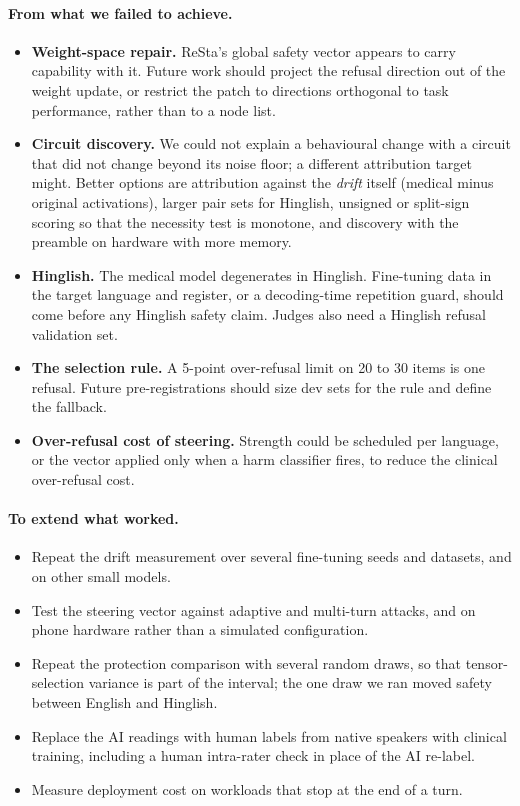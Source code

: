 \paragraph{From what we failed to achieve.}
\begin{itemize}
\item \textbf{Weight-space repair.} ReSta's global safety vector appears to carry capability with it. Future work should project the refusal direction out of the weight update, or restrict the patch to directions orthogonal to task performance, rather than to a node list.
\item \textbf{Circuit discovery.} We could not explain a behavioural change with a circuit that did not change beyond its noise floor; a different attribution target might. Better options are attribution against the \emph{drift} itself (medical minus original activations), larger pair sets for Hinglish, unsigned or split-sign scoring so that the necessity test is monotone, and discovery with the preamble on hardware with more memory.
\item \textbf{Hinglish.} The medical model degenerates in Hinglish. Fine-tuning data in the target language and register, or a decoding-time repetition guard, should come before any Hinglish safety claim. Judges also need a Hinglish refusal validation set.
\item \textbf{The selection rule.} A 5-point over-refusal limit on 20 to 30 items is one refusal. Future pre-registrations should size dev sets for the rule and define the fallback.
\item \textbf{Over-refusal cost of steering.} Strength could be scheduled per language, or the vector applied only when a harm classifier fires, to reduce the clinical over-refusal cost.
\end{itemize}
\paragraph{To extend what worked.}
\begin{itemize}
\item Repeat the drift measurement over several fine-tuning seeds and datasets, and on other small models.
\item Test the steering vector against adaptive and multi-turn attacks, and on phone hardware rather than a simulated configuration.
\item Repeat the protection comparison with several random draws, so that tensor-selection variance is part of the interval; the one draw we ran moved safety between English and Hinglish.
\item Replace the AI readings with human labels from native speakers with clinical training, including a human intra-rater check in place of the AI re-label.
\item Measure deployment cost on workloads that stop at the end of a turn.
\end{itemize}

